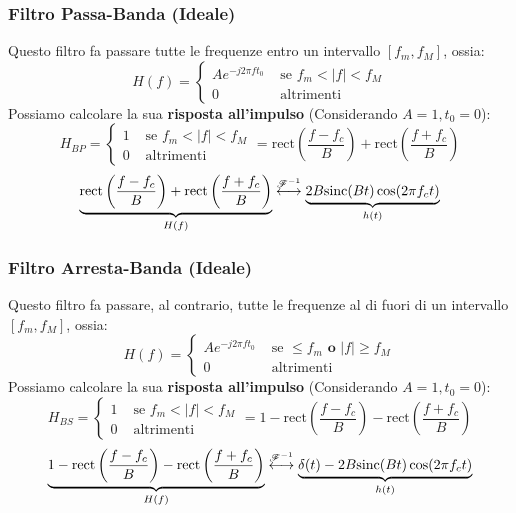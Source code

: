 \subsubsection{Filtro Passa-Banda (Ideale)}
Questo filtro fa passare tutte le frequenze entro un intervallo $\left[f_m,f_M\right]$, ossia:
\begin{equation}
    H(f) = \begin{cases}
        Ae^{-j2\pi ft_0} & \text{ se } f_m < |f| < f_M\\
        0 & \text{ altrimenti}
    \end{cases}
\end{equation}
Possiamo calcolare la sua \textbf{risposta all'impulso} (Considerando $A = 1, t_0 = 0$):
\begin{equation*}
    H_{BP} = \begin{cases}
        1 & \text{ se } f_m < |f| < f_M\\
        0 & \text{ altrimenti}
    \end{cases} = \text{rect}\left(\frac{f - f_c}{B}\right) + \text{rect}\left(\frac{f + f_c}{B}\right)
\end{equation*}
\begin{equation*}
    \underbrace{\text{rect}\left(\frac{f - f_c}{B}\right) + \text{rect}\left(\frac{f + f_c}{B}\right)}_{H(f)} \overset{{\mathscr{F}}^{-1}}{\longleftrightarrow} \underbrace{2B\text{sinc}(Bt)\cos(2\pi f_ct)}_{h(t)}
\end{equation*}

\subsubsection{Filtro Arresta-Banda (Ideale)}
Questo filtro fa passare, al contrario, tutte le frequenze al di fuori di un intervallo $\left[f_m,f_M\right]$, ossia:
\begin{equation}
    H(f) = \begin{cases}
        Ae^{-j2\pi ft_0} & \text{ se } \leq f_m \textbf{ o } |f| \geq f_M \\
        0 & \text{ altrimenti}
    \end{cases}
\end{equation}
Possiamo calcolare la sua \textbf{risposta all'impulso} (Considerando $A = 1, t_0 = 0$):
\begin{equation*}
    H_{BS} = \begin{cases}
        1 & \text{ se } f_m < |f| < f_M\\
        0 & \text{ altrimenti}
    \end{cases} = 1 - \text{rect}\left(\frac{f - f_c}{B}\right) - \text{rect}\left(\frac{f + f_c}{B}\right)
\end{equation*}
\begin{equation*}
    \underbrace{1 - \text{rect}\left(\frac{f - f_c}{B}\right) - \text{rect}\left(\frac{f + f_c}{B}\right)}_{H(f)} \overset{{\mathscr{F}}^{-1}}{\longleftrightarrow} \underbrace{\delta(t) - 2B\text{sinc}(Bt)\cos(2\pi f_ct)}_{h(t)}
\end{equation*}

